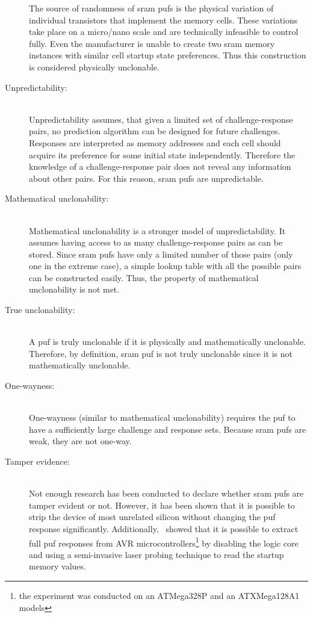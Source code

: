 \begin{description}
        The source of randomness of \gls{sram} \glspl{puf} is the physical variation of individual transistors that implement the memory cells. These variations take place on a micro/nano scale and are technically infeasible to control fully. Even the manufacturer is unable to create two \gls{sram} memory instances with similar cell startup state preferences. Thus this construction is considered physically unclonable.
    \item[Unpredictability:] \hfill \\
        Unpredictability assumes, that given a limited set of challenge-response pairs, no prediction algorithm can be designed for future challenges. Responses are interpreted as memory addresses and each cell should acquire its preference for some initial state independently. Therefore the knowledge of a challenge-response pair does not reveal any information about other pairs. For this reason, \gls{sram} \glspl{puf} are unpredictable. %
    \item[Mathematical unclonability:] \hfill \\
        Mathematical unclonability is a stronger model of unpredictability. It assumes having access to as many challenge-response pairs as can be stored. Since \gls{sram} \glspl{puf} have only a limited number of those pairs (only one in the extreme case), a simple lookup table with all the possible pairs can be constructed easily. Thus, the property of mathematical unclonability is not met.
    \item[True unclonability:] \hfill \\
        A \gls{puf} is truly unclonable if it is physically and mathematically unclonable. Therefore, by definition, \gls{sram} \gls{puf} is not truly unclonable since it is not mathematically unclonable.
    \item[One-wayness:] \hfill \\
        One-wayness (similar to mathematical unclonability) requires the \gls{puf} to have a sufficiently large challenge and response sets. Because \gls{sram} \glspl{puf} are weak, they are not one-way.
    \item[Tamper evidence:] \hfill \\
        Not enough research has been conducted to declare whether \gls{sram} \glspl{puf} are tamper evident or not\cite{Maes2012}. However, it has been shown that it is possible to strip the device of most unrelated silicon without changing the \gls{puf} response significantly\cite{Helfmaier2013}. Additionally,~\cite{Nedospasov2013} showed that it is possible to extract full \gls{puf} responses from AVR microcontrollers\footnote{the experiment was conducted on an ATMega328P and an ATXMega128A1 models} by disabling the logic core and using a semi-invasive laser probing technique to read the startup memory values.
\end{description}


